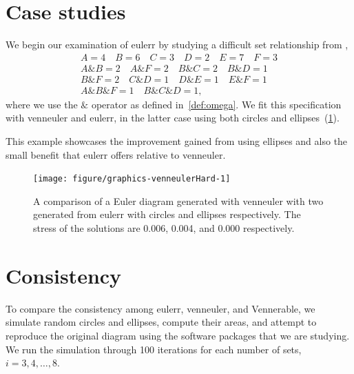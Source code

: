 \documentclass[
  oneside,
  usegeometry,
  numbers=noendperiod,
  openany,
  parskip=half
]{scrbook}\usepackage[]{graphicx}\usepackage{xcolor}
\newenvironment{knitrout}{}{} %
\newcommand{\pkg}[1]{{\fontseries{b}\selectfont #1}}
\begin{document}
\section{Case studies}
\label{sec:caseStudies}

We begin our examination of \pkg{eulerr} by studying a difficult set relationship from \citet{wilkinson_2012},
\begin{gather*}
A = 4 \quad B = 6 \quad C = 3 \quad D = 2 \quad E = 7 \quad F = 3\\
A\& B = 2 \quad A\&F = 2 \quad B\& C = 2 \quad B\&D = 1 \\
B\& F = 2 \quad C\&D = 1 \quad D\& E = 1 \quad E\&F = 1 \\
A\&B\&F = 1 \quad B\&C\&D = 1,\end{gather*}
where we use the $\&$ operator as defined in~\cref{def:omega}. We fit this specification with \pkg{venneuler} and \pkg{eulerr}, in the latter case using both circles and ellipses~(\cref{fig:venneulerHard}).

This example showcases the improvement gained from using ellipses and also the small benefit that \pkg{eulerr} offers relative to \pkg{venneuler}.

\begin{figure}[thb]
\begin{knitrout}
\color{fgcolor}

{\centering \texttt{[image: figure/graphics-venneulerHard-1]} 

}



\end{knitrout}
\caption{A comparison of a Euler diagram generated with \pkg{venneuler} with two generated from \pkg{eulerr} with circles and ellipses respectively. The stress of the solutions are 0.006, 0.004, and 0.000 respectively.}
\label{fig:venneulerHard}
\end{figure}

\section{Consistency}
\label{sec:consistency}

To compare the consistency among \pkg{eulerr}, \pkg{venneuler}, and \pkg{Vennerable}, we simulate random circles and ellipses, compute their areas, and attempt to reproduce the original diagram using the software packages that we are studying. We run the simulation through 100 iterations for each number of sets, $i = 3,4,\dots,8.$
\end{document}
